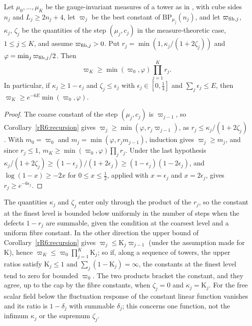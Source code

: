 \begin{corollary}[a tower]\label{rR6:tower}
Let $\mu_0,\dots,\mu_K$ be the gauge-invariant measures of a tower as in
\cite[Theorem~101]{BBLR26}, with cube sides $n_j$ and $L_j\ge2n_j+4$, let
$\varpi_j$ be the best constant of $\mathrm{BP}_{\mu_j}(n_j)$, and let
$\varpi_{{\rm fib},j}$, $\kappa_j$, $\zeta_j$ be the quantities of the step
$(\mu_j,c_j)$ in the measure-theoretic case, $1\le j\le K$, and assume
$\varpi_{{\rm fib},j}>0$. Put $r_j=\min(1,\kappa_j/(1+2\zeta_j))$ and
$\varphi=\min_j\varpi_{{\rm fib},j}/2$. Then
\[
\varpi_K\ge\min(\varpi_0,\varphi)\prod_{j=1}^Kr_j .
\]
In particular, if $\kappa_j\ge1-\epsilon_j$ and $\zeta_j\le\epsilon_j$ with
$\epsilon_j\in[0,\frac14]$ and $\sum_j\epsilon_j\le E$, then $\varpi_K\ge
e^{-6E}\min(\varpi_0,\varphi)$.
\end{corollary}

\begin{proof}
The coarse constant of the step $(\mu_j,c_j)$ is $\varpi_{j-1}$, so
Corollary~\ref{rR6:recursion} gives $\varpi_j\ge\min(\varphi,r_j
\varpi_{j-1})$, as $r_j\le\kappa_j/(1+2\zeta_j)$. With $m_0=\varpi_0$ and $m_j=\min(\varphi,r_jm_{j-1})$, induction
gives $\varpi_j\ge m_j$, and since $r_j\le1$, $m_K\ge\min(\varpi_0,\varphi)
\prod_jr_j$. Under the last hypothesis $\kappa_j/(1+2\zeta_j)\ge(1-
\epsilon_j)/(1+2\epsilon_j)\ge(1-\epsilon_j)(1-2\epsilon_j)$, and $\log(1-
x)\ge-2x$ for $0\le x\le\frac12$, applied with $x=\epsilon_j$ and $x=2
\epsilon_j$, gives $r_j\ge e^{-6\epsilon_j}$.
\end{proof}

The quantities $\kappa_j$ and $\zeta_j$ enter only through the product of
the $r_j$, so the constant at the finest level is bounded below uniformly
in the number of steps when the defects $1-r_j$ are summable, given the
condition at the coarsest level and a uniform fibre constant. In the other
direction the upper bound of Corollary~\ref{rR6:recursion} gives $\varpi_j
\le\mathrm K_j\varpi_{j-1}$ (under the assumption made for $\mathrm K$),
hence $\varpi_K\le\varpi_0\prod_{j=1}^K\mathrm K_j$; so if, along a
sequence of towers, the upper ratios satisfy $\mathrm K_j\le1$ and $\sum_j(1-\mathrm
K_j)=\infty$, the constants at the finest level tend to zero for bounded
$\varpi_0$. The two products bracket the constant, and they agree, up to the cap by
the fibre constants, when $\zeta_j=0$ and $\kappa_j=\mathrm K_j$. For the
free scalar field below the fluctuation response of the constant linear
function vanishes and its ratio is $1-\delta_j$ with summable $\delta_j$;
this concerns one function, not the infimum $\kappa_j$ or the supremum
$\zeta_j$.

